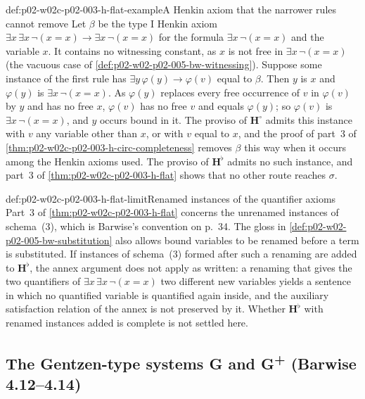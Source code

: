 \begin{hbexample}{def:p02-w02c-p02-003-h-flat-example}{A Henkin axiom that the narrower rules cannot remove}
Let \(\beta\) be the type I Henkin axiom
\(\exists x\,\exists x\,\neg(x=x)\to\exists x\,\neg(x=x)\) for the formula
\(\exists x\,\neg(x=x)\) and the variable \(x\).  It contains no
witnessing constant, as \(x\) is not free in \(\exists x\,\neg(x=x)\) (the
vacuous case of \cref{def:p02-w02-p02-005-bw-witnessing}).  Suppose some
instance of the first rule has \(\exists y\,\varphi(y)\to\varphi(v)\) equal
to \(\beta\).  Then \(y\) is \(x\) and \(\varphi(y)\) is
\(\exists x\,\neg(x=x)\).  As \(\varphi(y)\) replaces every free occurrence
of \(v\) in \(\varphi(v)\) by \(y\) and has no free \(x\), \(\varphi(v)\)
has no free \(v\) and equals \(\varphi(y)\); so \(\varphi(v)\) is
\(\exists x\,\neg(x=x)\), and \(y\) occurs bound in it.  The proviso of
\(\mathbf H^{\circ}\) admits this instance with \(v\) any variable other
than \(x\), or with \(v\) equal to \(x\), and the proof of part~3 of
\cref{thm:p02-w02c-p02-003-h-circ-completeness} removes \(\beta\) this way
when it occurs among the Henkin axioms used.  The proviso of
\(\mathbf H^{\flat}\) admits no such instance, and part~3 of
\cref{thm:p02-w02c-p02-003-h-flat} shows that no other route reaches
\(\sigma\).
\end{hbexample}

\begin{hbwarning}{def:p02-w02c-p02-003-h-flat-limit}{Renamed instances of the quantifier axioms}
Part~3 of \cref{thm:p02-w02c-p02-003-h-flat} concerns the unrenamed
instances of schema~(3), which is Barwise's convention on p.~34.  The gloss
in \cref{def:p02-w02-p02-005-bw-substitution} also allows bound variables
to be renamed before a term is substituted.  If instances of schema~(3)
formed after such a renaming are added to \(\mathbf H^{\flat}\), the annex
argument does not apply as written: a renaming that gives the two
quantifiers of \(\exists x\,\exists x\,\neg(x=x)\) two different new
variables yields a sentence in which no quantified variable is quantified
again inside, and the auxiliary satisfaction relation of the annex is not
preserved by it.  Whether \(\mathbf H^{\flat}\) with renamed instances
added is complete is not settled here.
\end{hbwarning}

\subsection{The Gentzen-type systems G and G\textsuperscript{+} (Barwise 4.12--4.14)}
\label{sec:p02-w02-p02-005-bw-gentzen}

